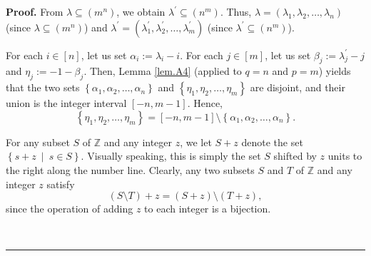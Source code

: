 \documentclass[numbers=enddot,12pt,final,onecolumn,notitlepage]{scrartcl}%
\theoremstyle{definition}
\newenvironment{proof}[1][Proof]{\noindent\textbf{#1.} }{\ \rule{0.5em}{0.5em}}
\begin{document}
\begin{enumerate}
\begin{proof}
From $\lambda\subseteq\left(  m^{n}\right)  $, we obtain $\lambda^{\prime
}\subseteq\left(  n^{m}\right)  $. Thus, $\lambda=\left(  \lambda_{1}%
,\lambda_{2},\ldots,\lambda_{n}\right)  $ (since $\lambda\subseteq\left(
m^{n}\right)  $) and $\lambda^{\prime}=\left(  \lambda_{1}^{\prime}%
,\lambda_{2}^{\prime},\ldots,\lambda_{m}^{\prime}\right)  $ (since
$\lambda^{\prime}\subseteq\left(  n^{m}\right)  $).

For each $i\in\left[  n\right]  $, let us set $\alpha_{i}:=\lambda_{i}-i$. For
each $j\in\left[  m\right]  $, let us set $\beta_{j}:=\lambda_{j}^{\prime}-j$
and $\eta_{j}:=-1-\beta_{j}$. Then, Lemma \ref{lem.A4} (applied to $q=n$ and
$p=m$) yields that the two sets $\left\{  \alpha_{1},\alpha_{2},\ldots
,\alpha_{n}\right\}  $ and $\left\{  \eta_{1},\eta_{2},\ldots,\eta
_{m}\right\}  $ are disjoint, and their union is the integer interval $\left[
-n,m-1\right]  $. Hence,%
\begin{equation}
\left\{  \eta_{1},\eta_{2},\ldots,\eta_{m}\right\}  =\left[  -n,m-1\right]
\setminus\left\{  \alpha_{1},\alpha_{2},\ldots,\alpha_{n}\right\}  .
\label{pf.lem.Qlam2.comp1}%
\end{equation}


For any subset $S$ of $\mathbb{Z}$ and any integer $z$, we let $S+z$ denote
the set $\left\{  s+z\ \mid\ s\in S\right\}  $. Visually speaking, this is
simply the set $S$ shifted by $z$ units to the right along the number line.
Clearly, any two subsets $S$ and $T$ of $\mathbb{Z}$ and any integer $z$
satisfy%
\begin{equation}
\left(  S\setminus T\right)  +z=\left(  S+z\right)  \setminus\left(
T+z\right)  , \label{pf.lem.Qlam2.comp+z}%
\end{equation}
since the operation of adding $z$ to each integer is a bijection.


\end{proof}
\end{enumerate}
\end{document}
